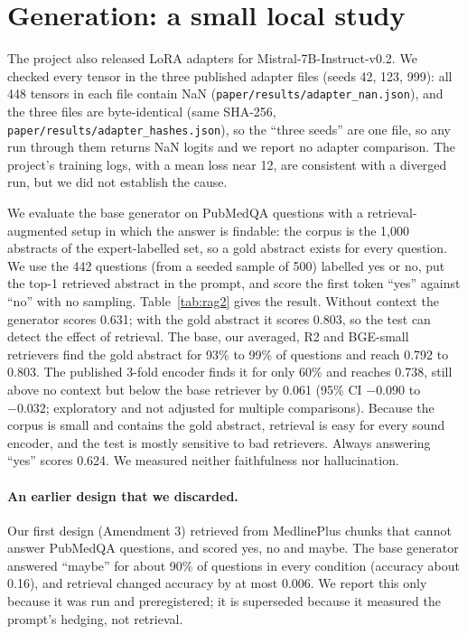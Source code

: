 \documentclass[11pt]{article}
\begin{document}
\begin{table}[t]\centering\small

\caption{Paired bootstrap differences in nDCG@10 against the base model (10,000 resamples), with Holm-adjusted $p$ over all comparisons in the analysis. The last row of each block compares our model with the best external baseline (chosen post hoc, so exploratory).}\label{tab:paired}
\end{table}

\section{Generation: a small local study}\label{sec:rag}
The project also released LoRA adapters for Mistral-7B-Instruct-v0.2. We checked every tensor in the three published adapter files (seeds 42, 123, 999): all 448 tensors in each file contain NaN (\texttt{paper/results/adapter\_nan.json}), and the three files are byte-identical (same SHA-256, \texttt{paper/results/adapter\_hashes.json}), so the ``three seeds'' are one file, so any run through them returns NaN logits and we report no adapter comparison. The project's training logs, with a mean loss near 12, are consistent with a diverged run, but we did not establish the cause.

We evaluate the base generator on PubMedQA \citep{jin2019pubmedqa} questions with a retrieval-augmented setup in which the answer is findable: the corpus is the 1,000 abstracts of the expert-labelled set, so a gold abstract exists for every question. We use the 442 questions (from a seeded sample of 500) labelled yes or no, put the top-1 retrieved abstract in the prompt, and score the first token ``yes'' against ``no'' with no sampling. Table~\ref{tab:rag2} gives the result. Without context the generator scores 0.631; with the gold abstract it scores 0.803, so the test can detect the effect of retrieval. The base, our averaged, R2 and BGE-small retrievers find the gold abstract for 93\% to 99\% of questions and reach 0.792 to 0.803. The published 3-fold encoder finds it for only 60\% and reaches 0.738, still above no context but below the base retriever by 0.061 (95\% CI $-0.090$ to $-0.032$; exploratory and not adjusted for multiple comparisons). Because the corpus is small and contains the gold abstract, retrieval is easy for every sound encoder, and the test is mostly sensitive to bad retrievers. Always answering ``yes'' scores 0.624. We measured neither faithfulness nor hallucination.

\paragraph{An earlier design that we discarded.} Our first design (Amendment 3) retrieved from MedlinePlus chunks that cannot answer PubMedQA questions, and scored yes, no and maybe. The base generator answered ``maybe'' for about 90\% of questions in every condition (accuracy about 0.16), and retrieval changed accuracy by at most 0.006. We report this only because it was run and preregistered; it is superseded because it measured the prompt's hedging, not retrieval.
\end{document}
